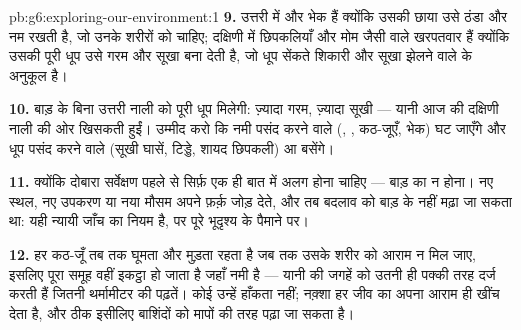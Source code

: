 \begin{solution}{pb:g6:exploring-our-environment:1}
\textbf{9.} उत्तरी में  और भेक हैं क्योंकि उसकी छाया उसे ठंडा और नम रखती
है, जो उनके शरीरों को चाहिए; दक्षिणी में छिपकलियाँ और मोम जैसी  वाले
खरपतवार हैं क्योंकि उसकी पूरी धूप उसे गरम और सूखा बना देती है, जो धूप
सेंकते शिकारी और सूखा झेलने वाले  के अनुकूल है।

\textbf{10.} बाड़ के बिना उत्तरी नाली को पूरी धूप मिलेगी: ज़्यादा गरम,
ज़्यादा सूखी --- यानी  आज की दक्षिणी नाली की ओर खिसकती हुईं।
उम्मीद करो कि नमी पसंद करने वाले (, , कठ-जूएँ, भेक) घट जाएँगे
और धूप पसंद करने वाले (सूखी घासें, टिड्डे, शायद छिपकली) आ बसेंगे।

\textbf{11.} क्योंकि दोबारा सर्वेक्षण पहले से सिर्फ़ एक ही बात में अलग
होना चाहिए --- बाड़ का न होना। नए स्थल, नए उपकरण या नया मौसम अपने
फ़र्क़ जोड़ देते, और तब बदलाव को बाड़ के  नहीं मढ़ा जा सकता था:
यही न्यायी जाँच का नियम है, पर पूरे भूदृश्य के पैमाने पर।

\textbf{12.} हर कठ-जूँ तब तक घूमता और मुड़ता रहता है जब तक उसके शरीर को
आराम न मिल जाए, इसलिए पूरा समूह वहीं इकट्ठा हो जाता है जहाँ नमी है ---
यानी  की जगहें  को उतनी ही पक्की तरह दर्ज करती हैं
जितनी थर्मामीटर की पढ़तें। कोई उन्हें हाँकता नहीं; नक़्शा हर जीव का अपना
आराम ही खींच देता है, और ठीक इसीलिए बाशिंदों को मापों की तरह पढ़ा जा
सकता है।
\end{solution}
